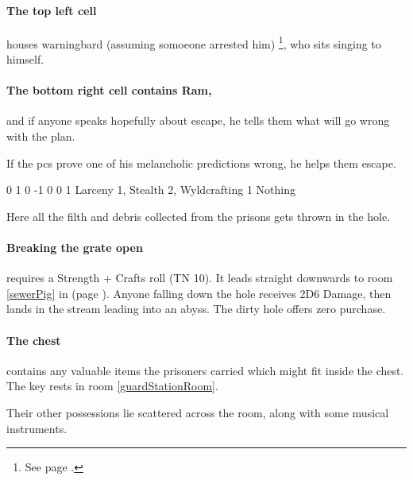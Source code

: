 

\paragraph{The top left cell}
houses \gls{warningbard} (assuming somoeone arrested him)%
\footnote{See page \pageref{warningbard}.},
who sits singing to himself.

\paragraph{The bottom right cell contains Ram,}
and if anyone speaks hopefully about escape, he tells them what will go wrong with the plan.

If the \glspl{pc} prove one of his melancholic predictions wrong, he helps them escape.

{0}%
{1}%
{{0}%
{-1}%
{0}}%
{0}%
{1}%
{Larceny 1, Stealth 2, Wyldcrafting 1}%
{Nothing}%
{}


Here all the filth and debris collected from the prisons gets thrown in the hole.

\paragraph{Breaking the grate open}
requires a Strength + Crafts roll (TN 10).
It leads straight downwards to room \ref{sewerPig} in \lowercase{} (page \pageref{sewerPig}).
Anyone falling down the hole receives 2D6 Damage, then lands in the stream leading into an abyss.
The dirty hole offers zero purchase.


\paragraph{The chest}
contains any valuable items the prisoners carried which might fit inside the chest.
The key rests in room \ref{guardStationRoom}.

Their other possessions lie scattered across the room, along with some musical instruments.

